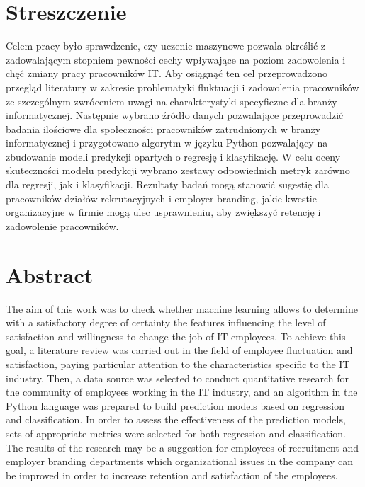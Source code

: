 \chapter*{Streszczenie} %
Celem pracy było sprawdzenie, czy uczenie maszynowe pozwala określić z zadowalającym stopniem
pewności cechy wpływające na poziom zadowolenia i chęć zmiany pracy pracowników IT.
Aby osiągnąć ten cel przeprowadzono przegląd literatury w zakresie problematyki fluktuacji i zadowolenia pracowników
ze szczególnym zwróceniem uwagi na charakterystyki specyficzne dla branży informatycznej.
Następnie wybrano źródło danych pozwalające przeprowadzić badania ilościowe dla społeczności pracowników zatrudnionych w branży informatycznej
i przygotowano algorytm w języku Python pozwalający na zbudowanie modeli predykcji opartych o regresję i klasyfikację.
W celu oceny skuteczności modelu predykcji wybrano zestawy odpowiednich metryk zarówno dla regresji, jak i klasyfikacji.
Rezultaty badań mogą stanowić sugestię dla pracowników działów rekrutacyjnych i employer branding,
jakie kwestie organizacyjne w firmie mogą ulec usprawnieniu, aby zwiększyć retencję i zadowolenie pracowników.

\begingroup
\renewcommand{\cleardoublepage}{}
\renewcommand{\clearpage}{}
\chapter*{Abstract} %

The aim of this work was to check whether machine learning allows to determine with a satisfactory degree of certainty the features influencing the level of satisfaction and willingness to change the job of IT employees.
To achieve this goal, a literature review was carried out in the field of employee fluctuation and satisfaction, paying particular attention to the characteristics specific to the IT industry.
Then, a data source was selected to conduct quantitative research for the community of employees working in the IT industry,
and an algorithm in the Python language was prepared to build prediction models based on regression and classification.
In order to assess the effectiveness of the prediction models, sets of appropriate metrics were selected for both regression and classification.
The results of the research may be a suggestion for employees of recruitment and employer branding departments
which organizational issues in the company can be improved in order to increase retention and satisfaction of the employees.

\endgroup
{}
